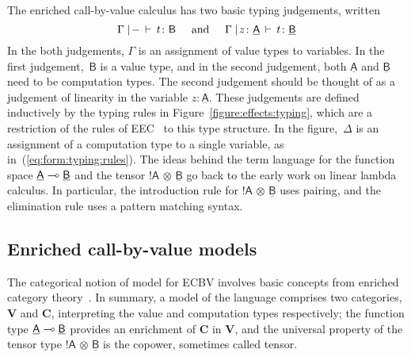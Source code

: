 \documentclass{LMCS}
\newcommand{\comptype}[1]{\underline{#1}}
\newcommand{\co}{\colon}
\newcommand{\VA}{\mathsf{A}}
\newcommand{\VB}{\mathsf{B}}
\newcommand{\CA}{\comptype{\mathsf{A}}}
\newcommand{\CB}{\comptype{\mathsf{B}}}
\newcommand{\tensor}{\otimes}
\newcommand{\ltensortype}[2]{{!} #1 \, {\tensor} \, #2}
\newcommand{\rIn}[2]{#1 \colon  #2}
\newcommand{\aj}[4]{#1 \mid  \! #2 \, \vdash \, \rIn{#3}{#4}}
\newcommand{\tj}[3]{\aj{#1}{{-}}{#2}{#3}}
\newcommand{\ECBV}{ECBV}
\newcommand{\VCat}{\fixedcatfont{V}} \newcommand{\CCat}{\fixedcatfont{C}} \newcommand{\DCat}{\fixedcatfont{D}}
\newcommand{\fixedcatfont}{\mathbf}
\newcommand{\GAP}{\hspace*{.5cm}}
\begin{document}
The enriched call-by-value calculus has two basic typing judgements, written
\begin{equation}
\label{eq:form:typing:rules}
\tj{\Gamma}{t}{\VB} \GAP \text{and} \GAP \aj{\Gamma}{z \co \CA}t{\CB}
\end{equation}
In the both judgements, $\Gamma$ is an assignment of value types to
variables.  In the first judgement,~$\VB$ is a value type, and in the second judgement, both $\CA$ and
$\CB$ need to be computation types.  The second judgement should be
thought of as a judgement of linearity in the variable $z \co
\CA$. These judgements are defined inductively by the typing rules in
Figure~\ref{figure:effects:typing}, which are a restriction of the
rules of EEC~\cite{EEC:journal} 
to this type structure. In the figure,~$\Delta$ is an
assignment of a computation type to a single variable, as
in~(\ref{eq:form:typing:rules}).  The ideas behind the term language
for the function space $\CA\lpop\CB$ and the tensor
$\ltensortype\VA\CB$ go back to the early work on linear lambda
calculus.  In particular, the introduction rule for
$\ltensortype\VA\CB$ uses pairing, and the elimination rule uses a
pattern matching syntax.



\subsection{Enriched call-by-value models}
\label{sec:adjmodels}
The categorical notion of model for {\ECBV}
involves basic concepts from enriched category theory~\cite{Kelly:Book}.
In summary, a model of the language comprises two categories,
$\VCat$ and $\CCat$, interpreting the value and computation types 
respectively; the function type $\CA\lpop\CB$ provides 
an enrichment of $\CCat$ in $\VCat$, and the universal property of the tensor
type $\ltensortype\VA\CB$ is the copower, sometimes called tensor.
\end{document}
